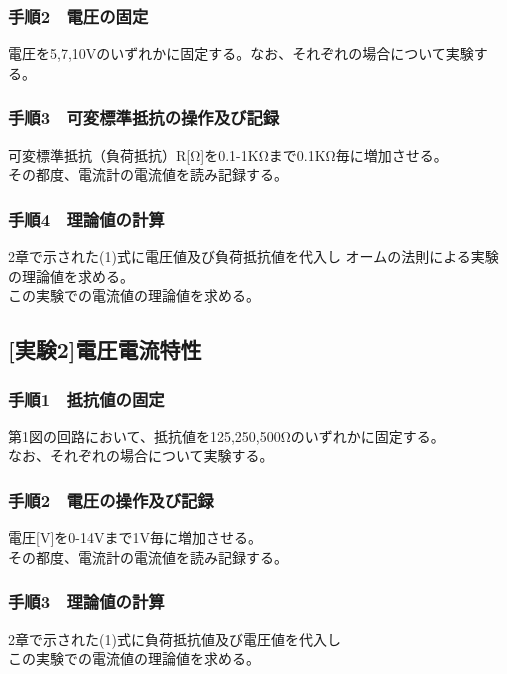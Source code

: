 \documentclass[titlepage]{jarticle}
\begin{document}
\subsubsection{手順2　電圧の固定}
電圧を5,7,10Vのいずれかに固定する。なお、それぞれの場合について実験する。
\subsubsection{手順3　可変標準抵抗の操作及び記録}
可変標準抵抗（負荷抵抗）R[Ω]を0.1-1KΩまで0.1KΩ毎に増加させる。\\
その都度、電流計の電流値を読み記録する。
\subsubsection{手順4　理論値の計算}
2章で示された(1)式に電圧値及び負荷抵抗値を代入し
オームの法則による実験の理論値を求める。\\
この実験での電流値の理論値を求める。

\subsection{[実験2]電圧電流特性}
\subsubsection{手順1　抵抗値の固定}
第1図の回路において、抵抗値を125,250,500Ωのいずれかに固定する。\\
なお、それぞれの場合について実験する。
\subsubsection{手順2　電圧の操作及び記録}
電圧[V]を0-14Vまで1V毎に増加させる。\\
その都度、電流計の電流値を読み記録する。
\subsubsection{手順3　理論値の計算}
2章で示された(1)式に負荷抵抗値及び電圧値を代入し\\
この実験での電流値の理論値を求める。
\end{document}
